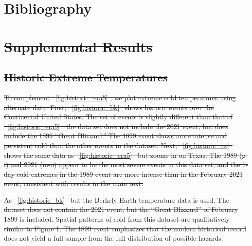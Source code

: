 \documentclass[12pt]{iopart}
\providecommand{\DIFdeltex}[1]{{\protect\color{red}\sout{#1}}}                      %
\providecommand{\DIFdelbegin}{} %
\providecommand{\DIFdelFL}[1]{\DIFdel{#1}} %
\providecommand{\DIFdel}[1]{\texorpdfstring{\DIFdeltex{#1}}{}} %
\newcommand{\DIFscaledelfig}{0.5}
\newlength{\DIFdelgraphicswidth} %
\newlength{\DIFdelgraphicsheight} %
\newcommand{\DIFdelincludegraphics}[2][]{%
\sbox{\DIFdelgraphicsbox}{\DIFOincludegraphics[#1]{#2}}%
\settoboxwidth{\DIFdelgraphicswidth}{\DIFdelgraphicsbox} %
\settoboxtotalheight{\DIFdelgraphicsheight}{\DIFdelgraphicsbox} %
\scalebox{\DIFscaledelfig}{%
\parbox[b]{\DIFdelgraphicswidth}{\usebox{\DIFdelgraphicsbox}\\[-\baselineskip] \rule{\DIFdelgraphicswidth}{0em}}\llap{\resizebox{\DIFdelgraphicswidth}{\DIFdelgraphicsheight}{%
\setlength{\unitlength}{\DIFdelgraphicswidth}%
\begin{picture}(1,1)%
\thicklines\linethickness{2pt} %
{\color[rgb]{1,0,0}\put(0,0){\framebox(1,1){}}}%
{\color[rgb]{1,0,0}\put(0,0){\line( 1,1){1}}}%
{\color[rgb]{1,0,0}\put(0,1){\line(1,-1){1}}}%
\end{picture}%
}\hspace*{3pt}}} %
} %
\DeclareRobustCommand{\DIFdelbegin}{\DIFOdelbegin \let\includegraphics\DIFdelincludegraphics} %
\begin{document}
\section*{Bibliography}


\DIFdelbegin %

\section{\DIFdel{Supplemental Results}}
\addtocounter{section}{-1}%

\subsection{\DIFdel{Historic Extreme Temperatures}}
\addtocounter{subsection}{-1}%

\DIFdel{To complement \mbox{%
    \cref{fig:historic_era5}}\hspace{0pt}%
  , we plot extreme cold temperatures using alternate data.
  First, \mbox{%
    \cref{fig:historic_bk} }\hspace{0pt}%
  shows historic events over the Continental United States.
  The set of events is slightly different than that of \mbox{%
    \cref{fig:historic_era5}}\hspace{0pt}%
  : the data set does not include the 2021 event, but does include the 1899 ``Great Blizzard.''
  The 1899 event shows more intense and persistent cold than the other events in the dataset.
  Next, \mbox{%
    \cref{fig:historic_tx} }\hspace{0pt}%
  shows the same data as \mbox{%
    \cref{fig:historic_era5} }\hspace{0pt}%
  but zooms in on Texas.
  The 1989 (g-i) and 2021 (m-o) appear to be the most severe events in this data set, and the 1-day cold extremes in the 1989 event are more intense than in the February 2021 event, consistent with results in the main text.
}%

{%
  \DIFdelFL{As \mbox{%
      \cref{fig:historic_bk} }\hspace{0pt}%
    but the Berkely Earth temperature data is used.
    The dataset does not contain the 2021 event, but the ``Great Blizzard'' of February 1899 is included.
    Spatial patterns of cold from this dataset are qualitatively similar to Figure 1.
    The 1899 event emphasizes that the modern historical record does not yield a full sample from the full distribution of possible hazards.
  }}%
\end{document}
